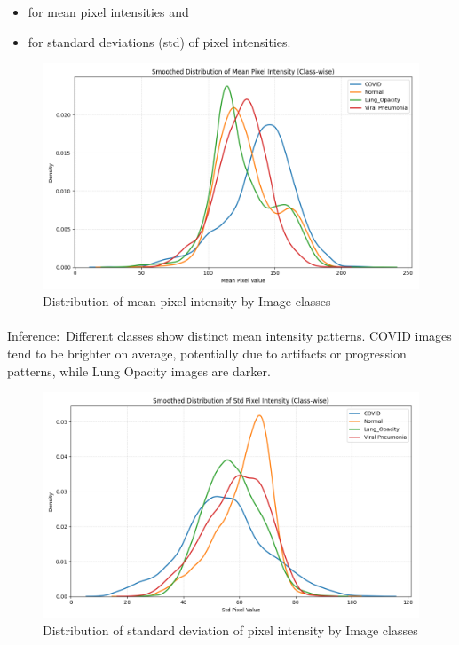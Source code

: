 \documentclass{article}
\begin{document}
\begin{itemize}
\item for mean pixel intensities and
\item for standard deviations (std) of pixel intensities.
\end{itemize}


\vspace{0.5cm}

\begin{figure}[h!] %
    \centering
    \includegraphics[width=0.5\linewidth]{KDE.Pixelintensity.png}
    \caption{Distribution of mean pixel intensity by Image classes}
    \label{fig:distr_mean_pixel_class}
\end{figure}
    
\paragraph{}
\underline{Inference:}\
Different classes show distinct mean intensity patterns. COVID images tend to be brighter on average, potentially due to artifacts or progression patterns, while Lung Opacity images are darker.

\vspace{0.5cm}

\begin{figure}[h!] %
    \centering
    \includegraphics[width=0.5\linewidth]{distribution_of_std_pixel_all.png}
    \caption{Distribution of standard deviation of pixel intensity by Image classes}
    \label{fig:distr_std_pixel_class}
\end{figure}

\vspace{0.5cm}
\end{document}
